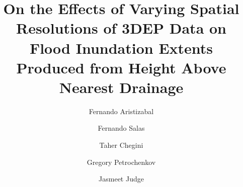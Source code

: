 \documentclass[preprint,review,12pt]{dependencies/elsarticle}
\begin{document}
%
\begin{frontmatter}
%
%


\title{On the Effects of Varying Spatial Resolutions of 3DEP Data on Flood Inundation Extents Produced from Height Above Nearest Drainage}


\author[lynk,nwc,uf]{Fernando Aristizabal}

\author[nwc]{Fernando Salas}
\author[uh]{Taher Chegini}
\author[usgs]{Gregory Petrochenkov}
\author[uf]{Jasmeet Judge}
%
%


\end{frontmatter}
\end{document}

